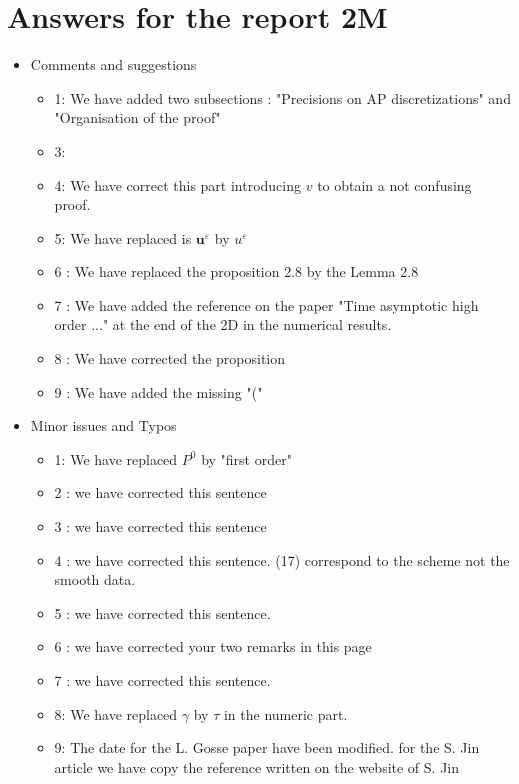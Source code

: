 \documentclass[a4paper,french,english,10pt]{article}
\newcommand{\eps}{\varepsilon}
\begin{document}
\section{Answers for the report 2M}
\begin{itemize}
\item Comments and suggestions
\begin{itemize}
\item 1: We have added two subsections : "Precisions on AP discretizations" and "Organisation of the proof"
\item 3:
\item 4: We have correct this part introducing $v$ to obtain a not confusing proof.
\item 5: We have replaced is $\mathbf{u}^{\eps}$ by $u^{\eps}$
\item 6 : We have replaced the proposition 2.8 by the Lemma 2.8
\item 7 : We have added the reference on the paper "Time asymptotic high order ..." at the end of the 2D in the numerical results.
\item 8 : We have corrected the proposition 
\item 9 : We have added the missing "("
\end{itemize}
\item Minor issues and Typos
\begin{itemize}
\item 1: We have replaced $P^0$ by "first order"
\item 2 : we have corrected this sentence 
\item 3 : we have corrected this sentence 
\item 4 : we have corrected this sentence. (17) correspond to the scheme not the smooth data.
\item 5 : we have corrected this sentence. 
\item 6 : we have corrected your two remarks in this page 
\item 7 : we have corrected this sentence. 
\item 8: We have replaced $\gamma$ by $\tau$ in the numeric part.
\item 9: The date for the L. Gosse paper have been modified. for the S. Jin article we have copy the reference written on the website of S. Jin 
\end{itemize}
\end{itemize}
\end{document}
